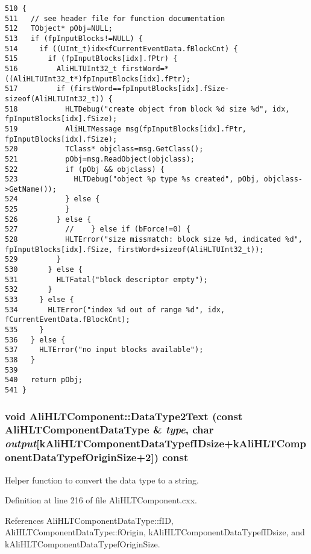 \footnotesize\begin{verbatim}510 {
511   // see header file for function documentation
512   TObject* pObj=NULL;
513   if (fpInputBlocks!=NULL) {
514     if ((UInt_t)idx<fCurrentEventData.fBlockCnt) {
515       if (fpInputBlocks[idx].fPtr) {
516         AliHLTUInt32_t firstWord=*((AliHLTUInt32_t*)fpInputBlocks[idx].fPtr);
517         if (firstWord==fpInputBlocks[idx].fSize-sizeof(AliHLTUInt32_t)) {
518           HLTDebug("create object from block %d size %d", idx, fpInputBlocks[idx].fSize);
519           AliHLTMessage msg(fpInputBlocks[idx].fPtr, fpInputBlocks[idx].fSize);
520           TClass* objclass=msg.GetClass();
521           pObj=msg.ReadObject(objclass);
522           if (pObj && objclass) {
523             HLTDebug("object %p type %s created", pObj, objclass->GetName());
524           } else {
525           }
526         } else {
527           //    } else if (bForce!=0) {
528           HLTError("size missmatch: block size %d, indicated %d", fpInputBlocks[idx].fSize, firstWord+sizeof(AliHLTUInt32_t));
529         }
530       } else {
531         HLTFatal("block descriptor empty");
532       }
533     } else {
534       HLTError("index %d out of range %d", idx, fCurrentEventData.fBlockCnt);
535     }
536   } else {
537     HLTError("no input blocks available");
538   }
539   
540   return pObj;
541 }
\end{verbatim}\normalsize 


\subsubsection{\setlength{\rightskip}{0pt plus 5cm}void Ali\-HLTComponent::Data\-Type2Text (const {\bf Ali\-HLTComponent\-Data\-Type} \& {\em type}, char {\em output}[k\-Ali\-HLTComponent\-Data\-Typef\-IDsize+k\-Ali\-HLTComponent\-Data\-Typef\-Origin\-Size+2]) const\hspace{0.3cm}{\tt  [protected]}}\label{classAliHLTComponent_b10}


Helper function to convert the data type to a string. 

Definition at line 216 of file Ali\-HLTComponent.cxx.

References Ali\-HLTComponent\-Data\-Type::f\-ID, Ali\-HLTComponent\-Data\-Type::f\-Origin, k\-Ali\-HLTComponent\-Data\-Typef\-IDsize, and k\-Ali\-HLTComponent\-Data\-Typef\-Origin\-Size.

